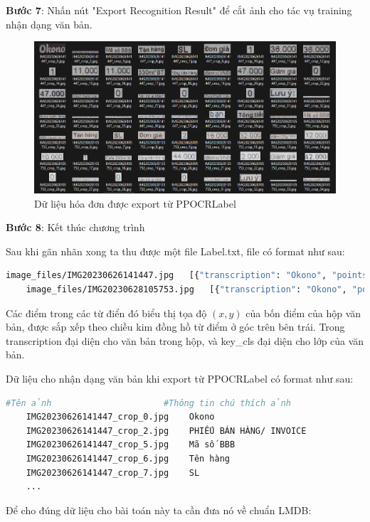 \textbf{Bước 7}: Nhấn nút "Export Recognition Result" để cắt ảnh cho tác vụ training nhận dạng văn bản.
\begin{figure}[h]
    \includegraphics[scale=0.45]{images/data-invoice-text-recognition.png}
    \centering
    \caption{Dữ liệu hóa đơn được export từ PPOCRLabel}
\end{figure}

\textbf{Bước 8}: Kết thúc chương trình

Sau khi gãn nhãn xong ta thu được một file Label.txt, file có format như sau: 
\begin{lstlisting}[language=bash]
    image_files/IMG20230626141447.jpg	[{"transcription": "Okono", "points": [[440, 195], [807, 201], [805, 333], [438, 327]], "difficult": false, "key_cls": "SELLER"}...]
    image_files/IMG20230628105753.jpg	[{"transcription": "Okono", "points": [[429, 469], [700, 469], [700, 542], [429, 542]], "difficult": true, "key_cls": "SELLER"}...]
\end{lstlisting}

Các điểm trong các từ điển đó biểu thị tọa độ $(x, y)$ của bốn điểm của hộp văn bản, được sắp xếp theo chiều kim đồng hồ từ điểm ở góc trên bên trái. Trong transcription đại diện cho văn bản trong hộp, và key\_cls đại diện cho lớp của văn bản.

Dữ liệu cho nhận dạng văn bản khi export từ PPOCRLabel có format như sau:
\begin{lstlisting}[language=bash]
    #Tên ảnh                      #Thông tin chú thích ảnh
    IMG20230626141447_crop_0.jpg	Okono
    IMG20230626141447_crop_2.jpg	PHIẾU BÁN HÀNG/ INVOICE
    IMG20230626141447_crop_5.jpg	Mã số BBB
    IMG20230626141447_crop_6.jpg	Tên hàng
    IMG20230626141447_crop_7.jpg	SL
    ...
\end{lstlisting}
Để cho đúng dữ liệu cho bài toán này ta cần đưa nó về chuẩn LMDB:

